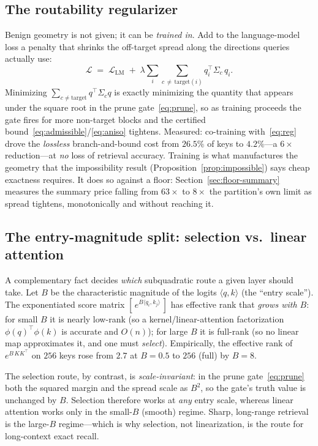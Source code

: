 \documentclass[11pt]{article}
\numberwithin{equation}{section}
\newcommand{\inner}[2]{\langle #1, #2\rangle}
\begin{document}
\subsection{The routability regularizer}

Benign geometry is not given; it can be \emph{trained in}. Add to the language-model loss a penalty that
shrinks the off-target spread along the directions queries actually use:
\begin{equation}\label{eq:reg}
\mathcal{L} \;=\; \mathcal{L}_{\text{LM}} \;+\; \lambda \sum_{i}\sum_{c\,\neq\, \text{target}(i)} q_i^\top \Sigma_c\, q_i .
\end{equation}
Minimizing $\sum_{c\neq\text{target}} q^\top\Sigma_c q$ is exactly minimizing the quantity that appears under
the square root in the prune gate~\eqref{eq:prune}, so as training proceeds the gate fires for more non-target
blocks and the certified bound~\eqref{eq:admissible}/\eqref{eq:aniso} tightens. Measured: co-training
with~\eqref{eq:reg} drove the \emph{lossless} branch-and-bound cost from $26.5\%$ of keys to $4.2\%$---a
$6\times$ reduction---at \emph{no} loss of retrieval accuracy. Training is what manufactures the geometry that
the impossibility result (Proposition~\ref{prop:impossible}) says cheap exactness requires. It does so
against a floor: Section~\ref{sec:floor-summary} measures the summary price falling from $63\times$ to
$8\times$ the partition's own limit as spread tightens, monotonically and without reaching it.

\subsection{The entry-magnitude split: selection vs.\ linear attention}

A complementary fact decides \emph{which} subquadratic route a given layer should take. Let $B$ be the
characteristic magnitude of the logits $\inner{q}{k}$ (the ``entry scale''). The exponentiated score matrix
$[\,e^{B\inner{q_i}{k_j}}\,]$ has effective rank that \emph{grows with $B$}: for small $B$ it is nearly
low-rank (so a kernel/linear-attention factorization $\phi(q)^\top\phi(k)$ is accurate and $O(n)$); for large
$B$ it is full-rank (so no linear map approximates it, and one must \emph{select}). Empirically, the effective
rank of $e^{B\,KK^\top}$ on $256$ keys rose from $2.7$ at $B=0.5$ to $256$ (full) by $B=8$.

The selection route, by contrast, is \emph{scale-invariant}: in the prune gate~\eqref{eq:prune} both the
squared margin and the spread scale as $B^2$, so the gate's truth value is unchanged by $B$. Selection
therefore works at \emph{any} entry scale, whereas linear attention works only in the small-$B$ (smooth)
regime. Sharp, long-range retrieval is the large-$B$ regime---which is why selection, not linearization, is the
route for long-context exact recall.
\end{document}
